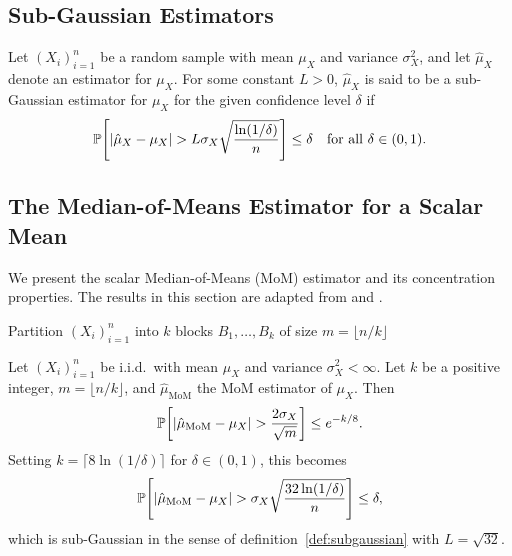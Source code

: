 \subsection{Sub-Gaussian Estimators}
\begin{definition}
\label{def:subgaussian}
Let $(X_i)_{i=1}^{n}$ be a random sample with mean $\mu_X$ and variance $\sigma_X^2$, and let $\hat{\mu}_X$ denote an estimator for $\mu_X$. For some constant $L > 0$, $\hat{\mu}_X$ is said to be a sub-Gaussian estimator for $\mu_X$ for the given confidence level $\delta$ if 
\begin{equation}
\label{eq:subgaussian}
    \operatorname{\mathbb{P}}\!\left[\left|\hat{\mu}_X - \mu_X\right| > L\sigma_X \sqrt{\frac{\ln(1/\delta)}{n}}\right] \leq \delta \quad \text{for all } \delta \in (0,1).
\end{equation}
\end{definition}


\subsection{The Median-of-Means Estimator for a Scalar Mean}
\label{sec:mom_prelim}
We present the scalar Median-of-Means (MoM) estimator and its concentration properties. The results in this section are adapted from \cite{devroye2016sub} and \cite{lugosi2019mean}.

\begin{algorithm}[H]
\label{alg:mom}
\caption{Scalar Median-of-Means Estimator}

Partition $(X_i)_{i=1}^{n}$ into $k$ blocks $B_1, \dots, B_k$ of size $m = \lfloor n/k \rfloor$\;


\;
\end{algorithm}

\begin{theorem}
\label{thm:mom_scalar}
Let $(X_i)_{i=1}^{n}$ be i.i.d.\ with mean $\mu_X$ and variance $\sigma_X^2 < \infty$. Let $k$ be a positive integer, $m = \lfloor n/k \rfloor$, and $\hat{\mu}_{\mathrm{MoM}}$ the MoM estimator of $\mu_X$. Then
\begin{equation}
\label{eq:mom_conc}
    \operatorname{\mathbb{P}}\!\left[\left|\hat{\mu}_{\mathrm{MoM}} - \mu_X\right| > \frac{2\sigma_X}{\sqrt{m}}\right] \leq e^{-k/8}.
\end{equation}
Setting $k = \lceil 8\ln(1/\delta) \rceil$ for $\delta \in (0,1)$, this becomes
\begin{equation}
\label{eq:mom_subgauss}
    \operatorname{\mathbb{P}}\!\left[\left|\hat{\mu}_{\mathrm{MoM}} - \mu_X\right| > \sigma_X\sqrt{\frac{32\ln(1/\delta)}{n}}\right] \leq \delta,
\end{equation}
which is sub-Gaussian in the sense of definition~\ref{def:subgaussian} with $L=\sqrt{32}$.
\end{theorem}

